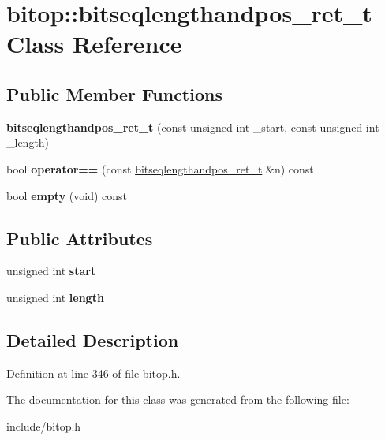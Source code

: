 \hypertarget{classbitop_1_1bitseqlengthandpos__ret__t}{\section{bitop\-:\-:bitseqlengthandpos\-\_\-ret\-\_\-t Class Reference}
\label{classbitop_1_1bitseqlengthandpos__ret__t}
}
\subsection*{Public Member Functions}
\begin{DoxyCompactItemize}
\item 
\hypertarget{classbitop_1_1bitseqlengthandpos__ret__t_ac5bb5423694a5b3c4ccb7d096b47a1e1}{{\bfseries bitseqlengthandpos\-\_\-ret\-\_\-t} (const unsigned int \-\_\-start, const unsigned int \-\_\-length)}\label{classbitop_1_1bitseqlengthandpos__ret__t_ac5bb5423694a5b3c4ccb7d096b47a1e1}

\item 
\hypertarget{classbitop_1_1bitseqlengthandpos__ret__t_aa01c0991734ca8f3d725995a9bf32869}{bool {\bfseries operator==} (const \hyperlink{classbitop_1_1bitseqlengthandpos__ret__t}{bitseqlengthandpos\-\_\-ret\-\_\-t} \&n) const }\label{classbitop_1_1bitseqlengthandpos__ret__t_aa01c0991734ca8f3d725995a9bf32869}

\item 
\hypertarget{classbitop_1_1bitseqlengthandpos__ret__t_a9eff391ef9964c4f387912dd2ec6a5a9}{bool {\bfseries empty} (void) const }\label{classbitop_1_1bitseqlengthandpos__ret__t_a9eff391ef9964c4f387912dd2ec6a5a9}

\end{DoxyCompactItemize}
\subsection*{Public Attributes}
\begin{DoxyCompactItemize}
\item 
\hypertarget{classbitop_1_1bitseqlengthandpos__ret__t_af31d1189102270d27e299c752407399b}{unsigned int {\bfseries start}}\label{classbitop_1_1bitseqlengthandpos__ret__t_af31d1189102270d27e299c752407399b}

\item 
\hypertarget{classbitop_1_1bitseqlengthandpos__ret__t_abc61247669dc39db345d2ca4500789a1}{unsigned int {\bfseries length}}\label{classbitop_1_1bitseqlengthandpos__ret__t_abc61247669dc39db345d2ca4500789a1}

\end{DoxyCompactItemize}


\subsection{Detailed Description}


Definition at line 346 of file bitop.\-h.



The documentation for this class was generated from the following file\-:\begin{DoxyCompactItemize}
\item 
include/bitop.\-h\end{DoxyCompactItemize}
